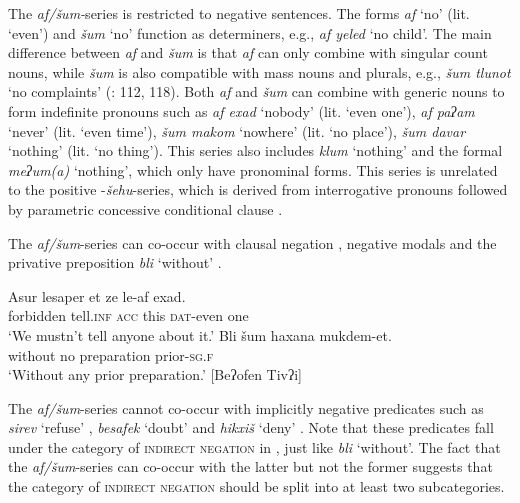 \documentclass[output=paper,colorlinks,citecolor=brown]{langscibook}
\begin{document}
The \textit{af/šum-}series is restricted to negative sentences. The forms \textit{af} ‘no' (lit. ‘even') and \textit{šum} ‘no' function as determiners, e.g., \textit{af yeled} ‘no child'. The main difference between \textit{af} and \textit{šum} is that \textit{af} can only combine with singular count nouns, while \textit{šum} is also compatible with mass nouns and plurals, e.g., \textit{šum tlunot} ‘no complaints’ (\citealt{Tzivoni1993}: 112, 118). Both \textit{af} and \textit{šum} can combine with generic nouns to form indefinite pronouns such as \textit{af exad} ‘nobody’ (lit. ‘even one'), \textit{af paʔam} ‘never’ (lit. ‘even time'), \textit{šum makom} ‘nowhere’ (lit. ‘no place'), \textit{šum davar} ‘nothing’ (lit. ‘no thing'). This series also includes \textit{klum} ‘nothing’ and the formal \textit{meʔum(a)} ‘nothing’, which only have pronominal forms. This series is unrelated to the positive {}-\textit{šehu}{}-series, which is derived from interrogative pronouns followed by parametric concessive conditional clause \citep[298]{Haspelmath1997}.

The \textit{af/šum}{}-series can co-occur with clausal negation , negative modals  and the privative preposition \textit{bli} ‘without’ .

\ea\label{ex:heb:20}
    \ea\label{ex:heb:20a}
        \gll Asur lesaper et ze le-af exad.\\
             forbidden tell.\textsc{inf} \textsc{acc} this \textsc{dat}{}-even one\\
        \glt ‘We mustn’t tell anyone about it.’ \citep[336]{Tzivoni1993} 
    \ex\label{ex:heb:20b}
        \gll Bli šum haxana mukdem-et.\\
            without no preparation prior-\textsc{sg.f}\\
        \glt ‘Without any prior preparation.’ [Beʔofen Tivʔi]
    \z 
\z 

The \textit{af/šum}{}-series cannot co-occur with implicitly negative predicates such as \textit{sirev} ‘refuse’ , \textit{besafek} ‘doubt’ and \textit{hikxiš} ‘deny’ \citep[306]{Glinert1989}. Note that these predicates fall under the category of \textsc{indirect} \textsc{negation} in \citet{Haspelmath1997}, just like \textit{bli} ‘without’. The fact that the \textit{af/šum}{}-series can co-occur with the latter but not the former suggests that the category of \textsc{indirect} \textsc{negation} should be split into at least two subcategories. 
\end{document}
